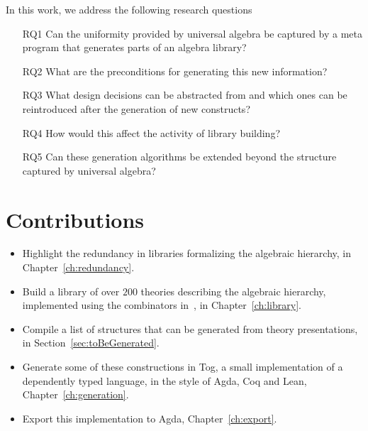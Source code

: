 In this work, we address the following research questions
\begin{enumerate}
    \item[RQ1] Can the uniformity provided by universal algebra be captured by a meta program that generates parts of an algebra library? 
    \item[RQ2] What are the preconditions for generating this new information? 
    \item[RQ3] What design decisions can be abstracted from and which ones can be reintroduced after the generation of new constructs?
    \item[RQ4] How would this affect the activity of library building?
    \item[RQ5] Can these generation algorithms be extended beyond the structure captured by universal algebra? 
\end{enumerate}

\section{Contributions}
\begin{itemize}
    \item Highlight the redundancy in libraries formalizing the algebraic hierarchy, in Chapter~\ref{ch:redundancy}. 
    \item Build a library of over $200$ theories describing the algebraic hierarchy, implemented using the combinators in~\cite{carette2018building}, in Chapter~\ref{ch:library}. 
    \item Compile a list of structures that can be generated from theory presentations, in Section~\ref{sec:toBeGenerated}. 
    \item Generate some of these constructions in Tog, a small implementation of a dependently typed language, in the style of Agda, Coq and Lean, Chapter~\ref{ch:generation}. 
    \item Export this implementation to Agda, Chapter~\ref{ch:export}. 
\end{itemize}  

